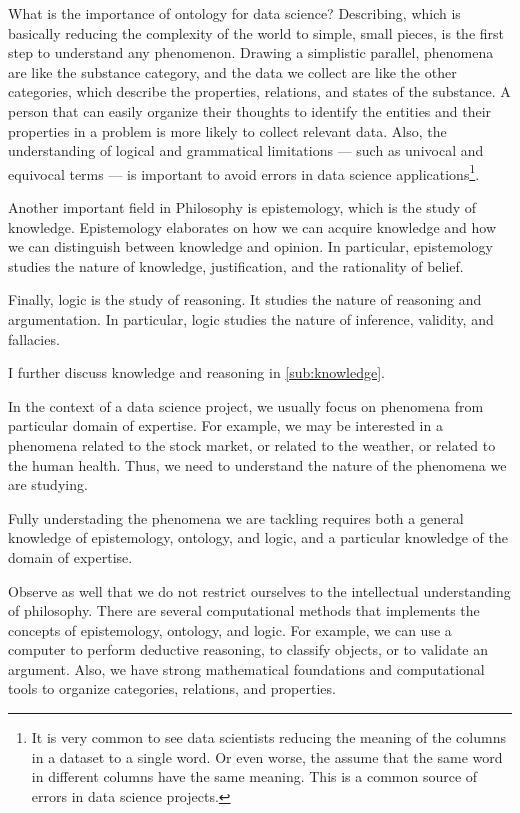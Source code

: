 What is the importance of ontology for data science?  Describing, which is basically
reducing the complexity of the world to simple, small pieces, is the first step to
understand any phenomenon.  Drawing a simplistic parallel, phenomena are like the
substance category, and the data we collect are like the other categories, which describe
the properties, relations, and states of the substance.  A person that can easily organize
their thoughts to identify the entities and their properties in a problem is more likely
to collect relevant data.  Also, the understanding of logical and grammatical limitations
--- such as univocal and equivocal terms --- is important to avoid errors in data
science applications\footnote{It is very common to see data scientists reducing the
meaning of the columns in a dataset to a single word.  Or even worse, the assume
that the same word in different columns have the same meaning.  This is a common source
of errors in data science projects.}.

Another important field in Philosophy is epistemology, which is the study of knowledge.
Epistemology elaborates on how we can acquire knowledge and how we can distinguish between
knowledge and opinion.  In particular, epistemology studies the nature of knowledge,
justification, and the rationality of belief.

Finally, logic is the study of reasoning.  It studies the nature of reasoning and
argumentation.  In particular, logic studies the nature of inference, validity, and
fallacies.

I further discuss knowledge and reasoning in \cref{sub:knowledge}.

In the context of a data science project, we usually focus on phenomena from particular domain of
expertise.  For example, we may be interested in a phenomena related to the stock
market, or related to the weather, or related to the human
health.  Thus, we need to understand the nature of the phenomena we are studying.

Fully understading the phenomena we are tackling requires both a general knowledge
of epistemology, ontology, and logic, and a particular knowledge of the domain of
expertise.

Observe as well that we do not restrict ourselves to the intellectual understanding of
philosophy.  There are several computational methods that implements the concepts of
epistemology, ontology, and logic.  For example, we can use a computer to perform
deductive reasoning, to classify objects, or to validate an argument.  Also, we have
strong mathematical foundations and computational tools to organize categories, relations, and
properties.

